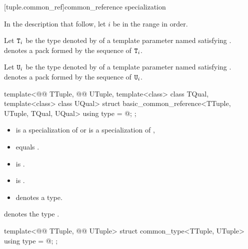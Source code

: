 \documentclass{wg21}
\begin{document}
\begin{addedblock}
[tuple.common_ref]{common_reference specialization}

\begin{addedblock}
    In the description that follow, let $i$ be in the range
     in order.

    Let $\texttt{T}_i$ be the type denoted by  of a template parameter named  satisfying .  denotes a pack formed by the sequence of $\texttt{T}_i$.

    Let $\texttt{U}_i$ be the type denoted by  of a template parameter named  satisfying .  denotes a pack formed by the sequence of $\texttt{U}_i$.
\end{addedblock}

\begin{itemdecl}
template<@@ TTuple, @@ UTuple, template<class> class TQual, template<class> class UQual>
struct basic_common_reference<TTuple, UTuple, TQual, UQual> {
    using type = @\seebelow@;
};
\end{itemdecl}

\begin{itemdescr}
\constraints
\begin{itemize}
    \item {} is a specialization of  or  is a specialization of ,
    \item {} equals .
    \item {} is .
    \item {} is .
    \item {} denotes a type.
\end{itemize}

 denotes the type .

\end{itemdescr}

\begin{itemdecl}
template<@@ TTuple, @@ UTuple>
struct common_type<TTuple, UTuple> {
    using type = @\seebelow@;
};
\end{itemdecl}
\begin{itemdescr}


\end{itemdescr}
\end{addedblock}
\end{document}
